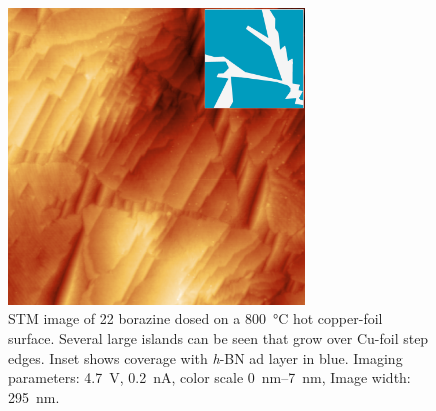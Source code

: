\begin{figure}
 \centering
 \includegraphics[width=0.7\textwidth]{./images/F150423-102732-with-inset}
 \caption{STM image of \SI{22}{\langmuir} borazine dosed on a \SI{800}{\celsius} hot copper-foil surface. Several large islands can be seen that grow over Cu-foil step edges. Inset shows coverage with \textit{h}-BN ad layer in blue. Imaging parameters: \SI{4.7}{\volt}, \SI{0.2}{\nano\ampere}, color scale \SIrange{0}{7}{\nano \meter}, Image width: \SI{295}{\nano \meter}.}
\end{figure}
